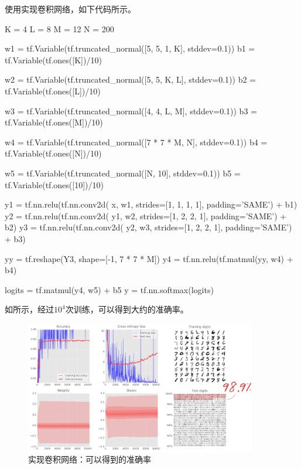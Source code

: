 \begin{content}
\begin{content}
使用\tf{}实现卷积网络，如下代码所示。

\begin{leftbar}
\begin{python}
K = 4 
L = 8
M = 12
N = 200

w1 = tf.Variable(tf.truncated_normal([5, 5, 1, K], stddev=0.1))
b1 = tf.Variable(tf.ones([K])/10)

w2 = tf.Variable(tf.truncated_normal([5, 5, K, L], stddev=0.1))
b2 = tf.Variable(tf.ones([L])/10)

w3 = tf.Variable(tf.truncated_normal([4, 4, L, M], stddev=0.1))
b3 = tf.Variable(tf.ones([M])/10)

w4 = tf.Variable(tf.truncated_normal([7 * 7 * M, N], stddev=0.1))
b4 = tf.Variable(tf.ones([N])/10)

w5 = tf.Variable(tf.truncated_normal([N, 10], stddev=0.1))
b5 = tf.Variable(tf.ones([10])/10)

y1 = tf.nn.relu(tf.nn.conv2d(
       x,  w1, strides=[1, 1, 1, 1], padding='SAME') + b1)
y2 = tf.nn.relu(tf.nn.conv2d(
       y1, w2, strides=[1, 2, 2, 1], padding='SAME') + b2)
y3 = tf.nn.relu(tf.nn.conv2d(
       y2, w3, strides=[1, 2, 2, 1], padding='SAME') + b3)

yy = tf.reshape(Y3, shape=[-1, 7 * 7 * M])
y4 = tf.nn.relu(tf.matmul(yy, w4) + b4)

logits = tf.matmul(y4, w5) + b5
y = tf.nn.softmax(logits)
\end{python}
\end{leftbar}

如所示，经过$10^4$次训练，可以得到大约的准确率。

\begin{figure}[H]
\centering
\includegraphics[width=0.9\textwidth]{figures/mnist-conv2d-1-result.png}
\caption{实现卷积网络：可以得到的准确率}
 \label{fig:mnist-conv2d-1-result}
\end{figure}


\end{content}
\end{content}
